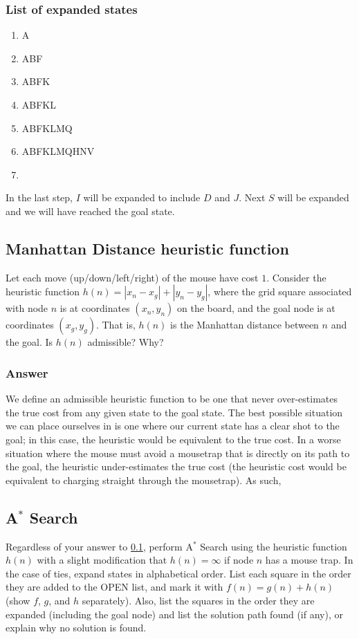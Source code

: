 \documentclass[12pt,letterpaper,titlepage]{article}
\begin{document}
\subsubsection[Answer]{List of expanded states}
\begin{enumerate}
\item A
\item ABF
\item ABFK
\item ABFKL
\item ABFKLMQ
\item ABFKLMQHNV
\item {}
\end{enumerate}
In the last step, $I$ will be expanded to include $D$ and $J$. Next $S$ will be expanded and we will have reached the goal state.
\subsection[Part 3]{Manhattan Distance heuristic function}
\label{1part3}
Let each move (up/down/left/right) of the mouse have cost $1$. Consider the heuristic function $h(n)=\left|x_n-x_g\right|+\left|y_n-y_g\right|$, where the grid square associated with node $n$ is at coordinates $\left(x_n,y_n\right)$ on the board, and the goal node is at coordinates $\left(x_g,y_g\right)$. That is, $h(n)$ is the Manhattan distance between $n$ and the goal. Is $h(n)$ admissible? Why?
\subsubsection{Answer}
We define an admissible heuristic function to be one that never over-estimates the true cost from any given state to the goal state. The best possible situation we can place ourselves in is one where our current state has a clear shot to the goal; in this case, the heuristic would be equivalent to the true cost. In a worse situation where the mouse must avoid a mousetrap that is directly on its path to the goal, the heuristic under-estimates the true cost (the heuristic cost would be equivalent to charging straight through the mousetrap). As such, 
\subsection[Part 4]{A$^*$ Search}
\label{1part4}
Regardless of your answer to \ref{1part3}, perform A$^*$ Search using the heuristic function $h(n)$ with a slight modification that $h(n)=\infty$ if node $n$ has a mouse trap. In the case of ties, expand states in alphabetical order. List each square in the order they are added to the OPEN list, and mark it with $f(n)=g(n)+h(n)$ (show $f$, $g$, and $h$ separately). Also, list the squares in the order they are expanded (including the goal node) and list the solution path found (if any), or explain why no solution is found.
\end{document}
